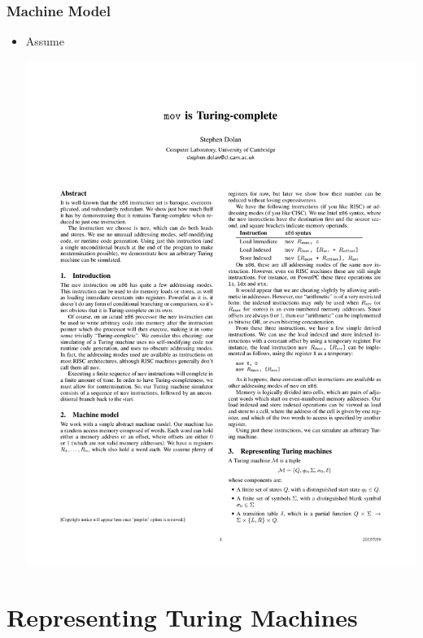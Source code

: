\documentclass{beamer}
\begin{document}
\begin{frame}[fragile]
\frametitle{Machine Model}

\begin{itemize}
\item Assume

\begin{center}
\includegraphics[scale=0.5]{figures/x86instructions}
\end{center}
\end{itemize}
\end{frame}

\section{Representing Turing Machines}
\end{document}
